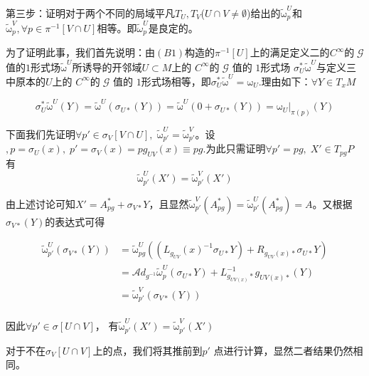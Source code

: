 \documentclass{ctexbook}
\begin{document}
第三步：证明对于两个不同的局域平凡$T_U,T_V$($U\cap V\neq\emptyset$)给出的$\tilde{\mathrm{\omega}}^{U}_{p}$和$\tilde{\mathrm{\omega}}^{V}_p,\forall p\in\pi^{-1}[V\cap U]$相等。即$\tilde{\mathscr{\omega}}^{U}_{p}$是良定的。

为了证明此事，我们首先说明：由$(B1)$构造的$\pi^{-1}[U]$上的满足定义二的$C^{\infty}\text{的}\;\mathscr{G}$值的$\mathrm{1}$形式场$\tilde{\mathrm{\omega}}^{U}$所诱导的开邻域$U\subset M$上的 $C^{\infty}\text{的}\;\mathscr{G}$ 值的 $\mathrm{1}$形式场 $\sigma_{U}^{*}\tilde{\mathrm{\omega}}^{U}$与定义三中原本的$U$上的 $C^{\infty}\text{的}\;\mathscr{G}$ 值的 $\mathrm{1}$形式场相等，即$\sigma_{U}^{*}\tilde{\mathrm{\omega}}^{U}=\mathrm{\omega}_U$.理由如下：$\forall Y\in T_{x}M$

\begin{equation}
    \sigma_{U}^{*}\tilde{\mathrm{\omega}}^{U}(Y)=\tilde{\mathrm{\omega}}^{U}(\sigma_{U*}(Y))=\tilde{\mathrm{\omega}}^{U}(0+\sigma_{U*}(Y))=\mathrm{\omega}_U|_{\pi(p)}(Y)
\end{equation}

下面我们先证明$\forall p'\in\sigma_{V}[V\cap U],\;\tilde{\mathrm{\omega}}^{U}_{p'}=\tilde{\mathrm{\omega}}^{V}_{p'}$。设$,p=\sigma_U(x),\;p'=\sigma_V(x)=pg_{UV}(x)\equiv pg$.为此只需证明$\forall p'=pg,\;X'\in T_{pg}P$ 有 \[ \tilde{\mathrm{\omega}}^{U}_{p'}(X')=\tilde{\mathrm{\omega}}^{V}_{p'}(X')\]

由上述讨论可知$X'=A^{*}_{pg}+\sigma_{V*}Y$，且显然$\tilde{\mathrm{\omega}}^{V}_{p'}(A^{*}_{pg})=\tilde{\mathrm{\omega}}^{U}_{p'}(A^{*}_{pg})=A$。又根据$\sigma_{V*}(Y)$的表达式可得

\begin{equation}
    \begin{split}
        \tilde{\mathrm{\omega}}^{U}_{p'}(\sigma_{V*}(Y))
        &=\tilde{\mathrm{\omega}}^{U}_{pg}\left(\left(L_{g_{UV}}(x)^{-1}\sigma_{U*}Y\right)+R_{g_{UV}(x)*}\sigma_{U*}Y\right)\\
        &=\mathscr{A}d_{g^{-1}}\tilde{\mathscr{\omega}}^{U}_p(\sigma_{U*}Y)+L^{-1}_{g_{UV(x)}*}g_{UV(x)*}(Y)\\
        &=\tilde{\mathrm{\omega}}^{V}_{p'}(\sigma_{V*}(Y))\\
    \end{split}    
\end{equation}

因此$\forall p'\in\sigma[U\cap V]$， 有$ \tilde{\mathrm{\omega}}^{U}_{p'}(X') =\tilde{\mathrm{\omega}}^{V}_{p'}(X')$

对于不在$\sigma_V[U\cap V]$上的点，我们将其推前到$p'$ 点进行计算，显然二者结果仍然相同。
\end{document}
